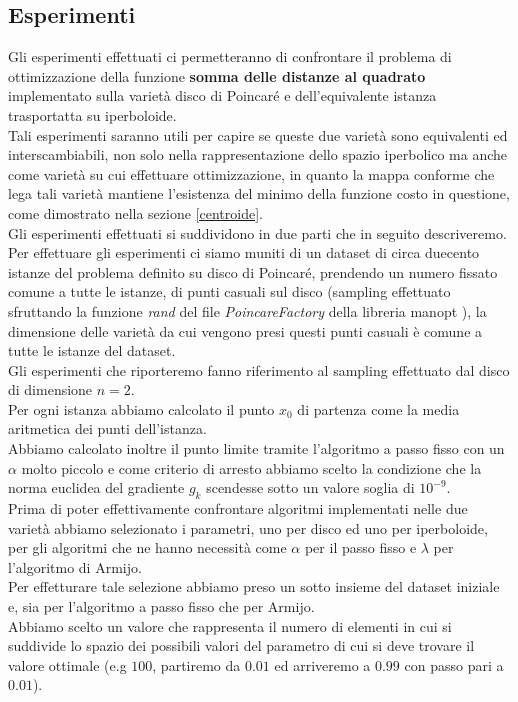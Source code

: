 \documentclass[a4paper, 12pt]{article}
\begin{document}
\subsection{Esperimenti}
Gli esperimenti effettuati ci permetteranno di confrontare il problema di ottimizzazione della funzione \textbf{somma delle distanze al quadrato} implementato sulla varietà disco di Poincaré e dell'equivalente istanza trasportatta su iperboloide.\\
Tali esperimenti saranno utili per capire se queste due varietà sono equivalenti ed interscambiabili, non solo nella rappresentazione dello spazio iperbolico ma anche come varietà su cui effettuare ottimizzazione, in quanto la mappa conforme che lega tali varietà mantiene l'esistenza del minimo della funzione costo in questione, come dimostrato nella sezione \ref{centroide}.\\
Gli esperimenti effettuati si suddividono in due parti che in seguito descriveremo.\\
Per effettuare gli esperimenti ci siamo muniti di un dataset di circa duecento istanze del problema definito su disco di Poincaré, prendendo un numero fissato comune a tutte le istanze, di punti casuali sul disco (sampling effettuato sfruttando la funzione \textit{rand} del file \textit{PoincareFactory} della libreria manopt \cite{ManOpt}), la dimensione delle varietà da cui vengono presi questi punti casuali è comune a tutte le istanze del dataset.\\
Gli esperimenti che riporteremo fanno riferimento al sampling effettuato dal disco di dimensione $n=2$.\\
Per ogni istanza abbiamo calcolato il punto $x_0$ di partenza come la media aritmetica dei punti dell'istanza.\\ Abbiamo calcolato inoltre il punto limite tramite l'algoritmo a passo fisso con un $\alpha$ molto piccolo e come criterio di arresto abbiamo scelto la condizione che la norma euclidea del gradiente $g_k$ scendesse sotto un valore soglia di $10^{-9}$.\\
Prima di poter effettivamente confrontare algoritmi implementati nelle due varietà abbiamo selezionato i parametri, uno per disco ed uno per iperboloide, per gli algoritmi che ne hanno necessità come $\alpha$ per il passo fisso e $\lambda$ per l'algoritmo di Armijo.\\
Per effetturare tale selezione abbiamo preso un sotto insieme del dataset iniziale e, sia per l'algoritmo a passo fisso che per Armijo.\\
Abbiamo scelto un valore che rappresenta il numero di elementi in cui si suddivide lo spazio dei possibili valori del parametro di cui si deve trovare  il valore ottimale (e.g $100$, partiremo da $0.01$ ed arriveremo a $0.99$ con passo pari a $0.01$).
\end{document}
